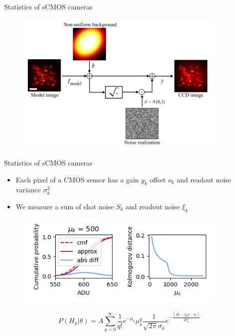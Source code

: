 \documentclass{beamer}					%
\begin{document}
\begin{frame}{Statistics of sCMOS cameras}
\begin{figure}
\includegraphics[width=10cm]{Generate.png}
\end{figure}
\end{frame}


\begin{frame}{Statistics of sCMOS cameras}
\begin{itemize}
\item Each pixel of a CMOS sensor has a gain $g_{k}$ offset $o_{k}$ and readout noise variance $\sigma_{k}^{2}$
\item We measure a sum of shot noise $S_{k}$ and readout noise $\xi_{k}$
\end{itemize}
\begin{figure}
\includegraphics[width=10cm]{Kolmogorov.png}
\end{figure}
\begin{equation*}
P(H_{k}|\theta) = A\sum_{q=0}^{\infty} \frac{1}{q!}e^{-\mu_{k}}\mu_{k}^{q}\frac{1}{\sqrt{2\pi}\sigma_{k}}e^{-\frac{(H_{k}-g_{k}q-o_{k})}{2\sigma_{k}^{2}}}
\end{equation*}
\end{frame}
\end{document}
